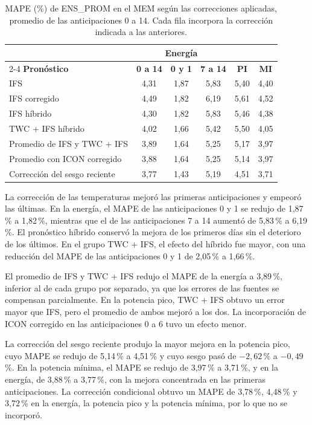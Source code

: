 \begin{table}[H]
	\centering
	\caption{MAPE (\%) de ENS\_PROM en el MEM según las correcciones aplicadas, promedio de las anticipaciones 0 a 14. Cada fila incorpora la corrección indicada a las anteriores.}
	\label{tab:resultados_postproceso}
	\small
	\setlength{\tabcolsep}{4pt}
	\renewcommand{\arraystretch}{1.15}
	\begin{tabular*}{\textwidth}{@{\extracolsep{\fill}}lccccc@{}}
		\toprule
		& \multicolumn{3}{c}{\textbf{Energía}} & & \\
		\cmidrule(lr){2-4}
		\textbf{Pronóstico} & \textbf{0 a 14} & \textbf{0 y 1} & \textbf{7 a 14} & \textbf{PI} & \textbf{MI} \\
		\midrule
		IFS & 4,31 & 1,87 & 5,83 & 5,40 & 4,40 \\
		IFS corregido & 4,49 & 1,82 & 6,19 & 5,61 & 4,52 \\
		IFS híbrido & 4,30 & 1,82 & 5,83 & 5,46 & 4,38 \\
		TWC + IFS híbrido & 4,02 & 1,66 & 5,42 & 5,50 & 4,05 \\
		Promedio de IFS y TWC + IFS & 3,89 & 1,64 & 5,25 & 5,17 & 3,97 \\
		Promedio con ICON corregido & 3,88 & 1,64 & 5,25 & 5,14 & 3,97 \\
		Corrección del sesgo reciente & 3,77 & 1,43 & 5,19 & 4,51 & 3,71 \\
		\bottomrule
	\end{tabular*}
\end{table}

La corrección de las temperaturas mejoró las primeras anticipaciones y empeoró las últimas. En la energía, el MAPE de las anticipaciones 0 y 1 se redujo de 1,87\,\% a 1,82\,\%, mientras que el de las anticipaciones 7 a 14 aumentó de 5,83\,\% a 6,19\,\%. El pronóstico híbrido conservó la mejora de los primeros días sin el deterioro de los últimos. En el grupo TWC + IFS, el efecto del híbrido fue mayor, con una reducción del MAPE de las anticipaciones 0 y 1 de 2,05\,\% a 1,66\,\%.

El promedio de IFS y TWC + IFS redujo el MAPE de la energía a 3,89\,\%, inferior al de cada grupo por separado, ya que los errores de las fuentes se compensan parcialmente. En la potencia pico, TWC + IFS obtuvo un error mayor que IFS, pero el promedio de ambos mejoró a los dos. La incorporación de ICON corregido en las anticipaciones 0 a 6 tuvo un efecto menor.

La corrección del sesgo reciente produjo la mayor mejora en la potencia pico, cuyo MAPE se redujo de 5,14\,\% a 4,51\,\% y cuyo sesgo pasó de $-2{,}62$\,\% a $-0{,}49$\,\%. En la potencia mínima, el MAPE se redujo de 3,97\,\% a 3,71\,\%, y en la energía, de 3,88\,\% a 3,77\,\%, con la mejora concentrada en las primeras anticipaciones. La corrección condicional obtuvo un MAPE de 3,78\,\%, 4,48\,\% y 3,72\,\% en la energía, la potencia pico y la potencia mínima, por lo que no se incorporó.

